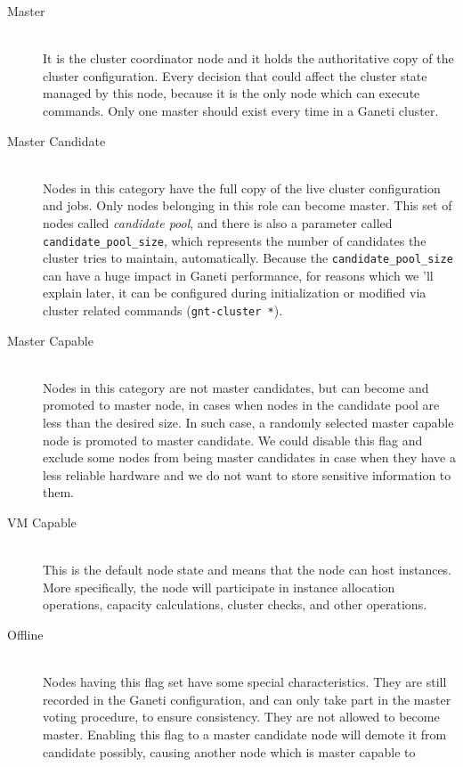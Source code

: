 \begin{description}
  \item[Master] \hfill \\
    It is the cluster coordinator node and it holds the authoritative copy of
    the cluster configuration. Every decision that could affect the cluster
    state managed by this node, because it is the only node which can execute
    commands. Only one master should exist every time in a Ganeti cluster.
  \item[Master Candidate] \hfill \\
    Nodes in this category have the full copy of the live cluster configuration
    and jobs. Only nodes belonging in this role can become master. This set of
    nodes called \emph{candidate pool}, and there is also a parameter called
    \texttt{candidate\_pool\_size}, which represents the number of candidates
    the cluster tries to maintain, automatically. Because the
    \texttt{candidate\_pool\_size} can have a huge impact in Ganeti performance,
    for reasons which we 'll explain later, it can be configured during
    initialization or modified via cluster related commands (\texttt{gnt-cluster
    *}).
  \item[Master Capable] \hfill \\
    Nodes in this category are not master candidates, but can become and
    promoted to master node, in cases when nodes in the candidate pool
    are less than the desired size. In such case, a randomly selected master
    capable node is promoted to master candidate. We could disable this flag
    and exclude some nodes from being master candidates in case when they have
    a less reliable hardware and we do not want to store sensitive information
    to them.
  \item[VM Capable] \hfill \\
    This is the default node state and means that the node can host instances.
    More specifically, the node will participate in instance allocation
    operations, capacity calculations, cluster checks, and other operations.
  \item[Offline] \hfill \\
    Nodes having this flag set have some special characteristics. They are still
    recorded in the Ganeti configuration, and can only take part in the
    master voting procedure, to ensure consistency. They are not allowed to
    become master. Enabling this flag to a master candidate node will demote
    it from candidate possibly, causing another node which is master capable to

\end{description}

